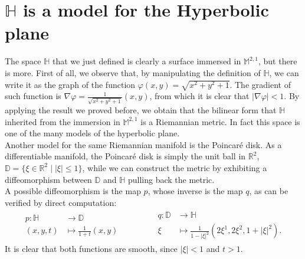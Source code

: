 \documentclass[a4paper,11pt,openright,twoside]{book}
\newcommand{\R}{\mathbb{R}}
\newcommand{\M}{\mathbb{M}^{2,1}}
\newcommand{\1}{\mathds{1}}
\theoremstyle{plain}
\theoremstyle{definition}
\theoremstyle{remark}
\begin{document}
\section{$\mathbb{H}$ is a model for the Hyperbolic plane}\label{sc:Hmodel}%
The space $\mathbb{H}$ that we just defined is clearly a surface immersed in $\M$, but there is more.
First of all, we observe that, by manipulating the definition of $\mathbb{H}$, we can write it as the graph of the function $\varphi(x,y) = \sqrt{x^2+y^2+1} $. The gradient of such function is $\nabla \varphi = \frac{1 }{\sqrt{x^2+y^2+1} }(x,y) $, from which it is clear that $|\nabla \varphi| <1$. By applying the result we proved before, we obtain that the bilinear form that $\mathbb{H}$ inherited from the immersion in $\M$ is a Riemannian metric.
In fact this space is one of the many models of the hyperbolic plane.\\
Another model for the same Riemannian manifold is the Poincaré disk. As a differentiable manifold, the Poincaré disk is simply the unit ball in $\R^2$, $\mathbb{D}=\{\xi\in \R^2\mid |\xi|\leq 1\} $, while we can construct the metric by exhibiting a diffeomorphism between $\mathbb{D}$ and $\mathbb{H}$ pulling back the metric.\\
A possible diffeomorphism is the map $p$, whose inverse is the map $q$, as can be verified by direct computation:
\begin{align*}
\begin{aligned}
	p\colon \mathbb{H} &\longrightarrow \mathbb{D} \\
	(x,y,t) &\longmapsto \frac{1}{1+t}(x,y)
\end{aligned}
\qquad\qquad
\begin{aligned}
	q\colon \mathbb{D} &\longrightarrow \mathbb{H} \\
	\xi &\longmapsto \frac{1}{1-|\xi|^2}(2\xi^1,2\xi^2,1+|\xi|^2).
\end{aligned}
\end{align*}
It is clear that both functions are smooth, since $|\xi| <1$ and $t>1$.\\
\end{document}
